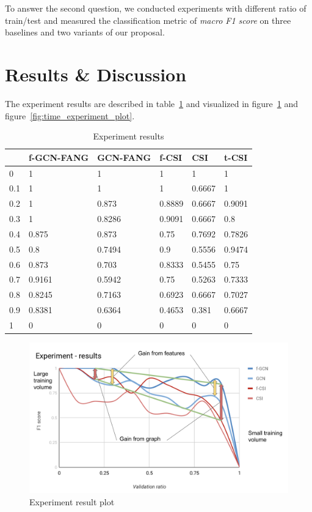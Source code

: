 \documentclass[fyp]{socreport}
\theoremstyle{definition}
\theoremstyle{hypothesis}
\begin{document}
To answer the second question, we conducted experiments with different ratio of train/test and measured the classification metric of \textit{macro F1 score} on three baselines and two variants of our proposal. 

\section{Results \& Discussion}
The experiment results are described in table~\ref{table:experiment_results} and visualized in figure~\ref{fig:experiment_plot} and figure~\ref{fig:time_experiment_plot}.

\begin{table}[t]
  \centering
  \tiny
  \begin{tabular}{|p{2cm}|p{2cm}|p{2cm}|p{2cm}|p{2cm}|p{2cm}|}
  \hline
     & f-GCN-FANG & GCN-FANG & f-CSI & CSI & t-CSI \\ \hline \hline
    0 & 1 & 1 & 1 & 1 & 1 \\ \hline
    0.1 & 1 & 1 & 1 & 0.6667 & 1 \\ \hline
    0.2 & 1 & 0.873 & 0.8889 & 0.6667 & 0.9091  \\ \hline
    0.3 & 1 & 0.8286 & 0.9091 & 0.6667 & 0.8 \\ \hline
    0.4 & 0.875 & 0.873 & 0.75 & 0.7692 & 0.7826 \\ \hline
    0.5 & 0.8 &	0.7494 & 0.9 & 0.5556 & 0.9474 \\ \hline
    0.6 & 0.873 & 0.703 & 0.8333 & 0.5455 & 0.75 \\ \hline
    0.7 & 0.9161 & 0.5942 &	0.75 & 0.5263 & 0.7333 \\ \hline
    0.8 & 0.8245 & 0.7163 & 0.6923 & 0.6667 & 0.7027 \\ \hline
    0.9 & 0.8381 & 0.6364 &	0.4653 & 0.381 & 0.6667 \\ \hline
    1 & 0 &	0 & 0 & 0 & 0 \\ \hline \hline
  \end{tabular}
  \caption{Experiment results}
  \label{table:experiment_results}
\end{table}

\begin{figure}[t]
\centering
\includegraphics[scale=0.5]{experiment_plot.png}
\caption{Experiment result plot}
\label{fig:experiment_plot}
\end{figure}
\end{document}
